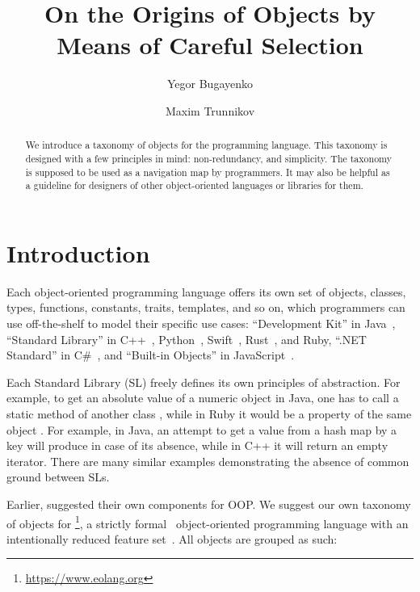 \documentclass[sigplan,nonacm]{acmart}
\title{On the Origins of Objects by Means of Careful Selection}
\author{Yegor Bugayenko}
\affiliation{
  \institution{Huawei}
  \country{Russia}
  \city{Moscow}
}
\author{Maxim Trunnikov}
\affiliation{
  \institution{Huawei}
  \country{Russia}
  \city{Moscow}
}
\begin{document}
\begin{abstract}
We introduce a taxonomy of objects for the \eolang{} programming language.
This taxonomy is designed with a few principles in mind: non-redundancy,
and simplicity. The taxonomy is supposed to be used as a navigation map
by \eolang{} programmers. It may also be helpful as a guideline for designers of
other object-oriented languages or libraries for them.
\end{abstract}

\maketitle

\section{Introduction}

Each object-oriented programming language offers its own set of objects, classes, types, functions, constants, traits, templates, and so on, which programmers can use off-the-shelf to model their specific use cases:
``Development Kit'' in Java~\citep{jdk2024,jdk8},
``Standard Library'' in
  C++~\citep{cpp2024,josuttis2012cpp},
  Python~\citep{python2024,hellmann2017python},
  Swift~\citep{swift2024,deitel2015swift},
  Rust~\citep{rust2024,blandy2021rust},
  and
  Ruby,
``.NET Standard'' in C\#~\citep{net2023,abrams2005net},
and ``Built-in Objects'' in JavaScript~\citep{js2024,crockford2008js}.

Each Standard Library (SL) freely defines its own principles of abstraction. For
example, to get an absolute value of a numeric object  in Java, one has
to call a static method of another class , while in Ruby it
would be a property of the same object . For example, in Java, an
attempt to get a value from a hash map by a key will produce  in case
of its absence, while in C++ it will return an empty iterator. There are many
similar examples demonstrating the absence of common ground between SLs.

Earlier, \citet{booch1990design} suggested their own components for OOP. We
suggest our own taxonomy of objects for
\eolang{}\footnote{\url{https://www.eolang.org}},
a strictly formal~\citep{kudasov2022formalizing} object-oriented programming language with an intentionally
reduced feature set~\citep{bugayenko2021eolang}.
All objects are grouped as such:
\end{document}
